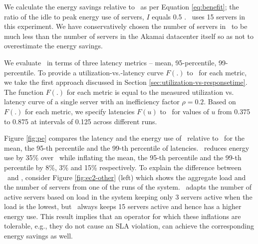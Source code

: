 %
We calculate the energy savings relative to \peakS\ as per Equation \ref{eq:benefit}; the ratio of the idle to peak energy use of servers, $I$ equals 0.5 \cite{barroso2007case}. \peakS\ uses 15 servers in this experiment. We have conservatively chosen the number of servers in \peakS\ to be much less than the number of servers in the Akamai datacenter itself so as not to overestimate the energy savings. 



We evaluate \shrink\ in terms of three latency metrics --  mean, 95-percentile, 99-percentile. 
To provide a utilization-vs.-latency curve $F(.)$ to \shrink\ for each metric, we take the first approach discussed in Section \ref{sec:utilization-vs-responsetime}. The function $F(.)$ for each metric is equal to the measured utilization vs. latency curve of a single server with an inefficiency factor $\rho = 0.2$.  Based on $F(.)$ for each metric, we specify latencies $F(u)$ to \shrink\ for values of $u$ from 0.375 to 0.875 at intervals of 0.125 across different runs. 



Figure \ref{fig:pe} compares the latency and the energy use of \shrink\ relative to \peakS\ for the mean, the 95-th percentile and the 99-th percentile of latencies. \shrink\ reduces energy use by 35\% over \peakS\ while inflating the mean, the 95-th percentile and the 99-th percentile by 8\%, 3\% and 15\% respectively. 
To explain the difference between \peakS\ and \shrink, consider Figure \ref{fig:ec2-other} (left)  which shows the aggregate load and the number of servers from one of the runs of the system. \shrink\  adapts the number of active servers based on load in the system keeping only 3 servers active when the load is the lowest, but \peakS\ always keeps 15 servers active and hence has a higher energy use. This result implies that an operator for which these inflations are tolerable, e.g., they do not cause an SLA violation, can achieve the corresponding energy savings as well. 








